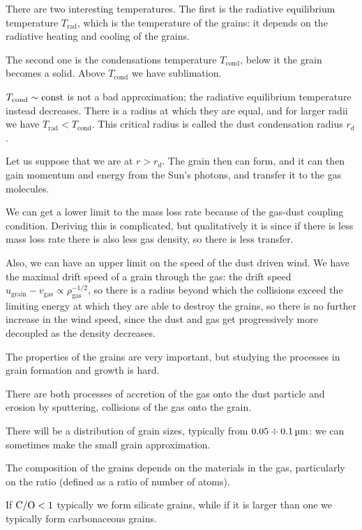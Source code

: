 \documentclass[main.tex]{subfiles}
\begin{document}
There are two interesting temperatures. The first is the radiative equilibrium temperature \(T _{\text{rad}}\), which is the temperature of the grains: it depends on the radiative heating and cooling of the grains. 

The second one is the condensations temperature \(T _{\text{cond}}\), below it the grain becomes a solid. 
Above \(T _{\text{cond}}\) we have sublimation. 

\(T _{\text{cond}} \sim \text{const}\) is not a bad approximation; the radiative equilibrium temperature instead decreases. 
There is a radius at which they are equal, and for larger radii we have \(T _{\text{rad}} < T _{\text{cond}}\). 
This critical radius is called the dust condensation radius \(r_{d}\). 

Let us suppose that we are at \(r > r_d\). 
The grain then can form, and it can then gain momentum and energy from the Sun's photons, and transfer it to the gas molecules. 

We can get a lower limit to the mass loss rate because of the gas-dust coupling condition. Deriving this is complicated, but qualitatively it is since if there is less mass loss rate there is also less gas density, so there is less transfer. 

Also, we can have an upper limit on the speed of the dust driven wind. We have the maximal drift speed of a grain through the gas: the drift speed \(u_{\text{grain}} - v _{\text{gas}} \propto \rho _{\text{gas}}^{-1/2}\), so there is a radius beyond which the collisions exceed the limiting energy at which they are able to destroy the grains, so there is no further increase in the wind speed, since the dust and gas get progressively more decoupled as the density decreases. 

The properties of the grains are very important, but studying the processes in grain formation and growth is hard. 

There are both processes of accretion of the gas onto the dust particle and erosion by sputtering, collisions of the gas onto the grain. 

There will be a distribution of grain sizes, typically from \(\num{.05} \divisionsymbol \SI{.1}{\micro\metre}\): we can sometimes make the small grain approximation. 

The composition of the grains depends on the materials in the gas, particularly on the  ratio (defined as a ratio of number of atoms).

If \(\ce{C/O} <1\) typically we form silicate grains, while if it is larger than one we typically form carbonaceous grains. 
\end{document}

